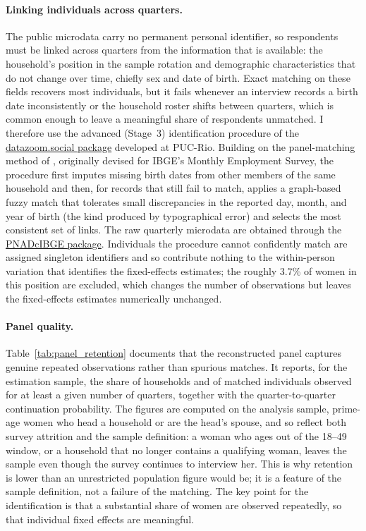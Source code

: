 \paragraph{Linking individuals across quarters.} The public microdata carry no permanent personal identifier, so respondents must be linked across quarters from the information that is available: the household's position in the sample rotation and demographic characteristics that do not change over time, chiefly sex and date of birth. Exact matching on these fields recovers most individuals, but it fails whenever an interview records a birth date inconsistently or the household roster shifts between quarters, which is common enough to leave a meaningful share of respondents unmatched. I therefore use the advanced (Stage~3) identification procedure of the \href{https://github.com/datazoompuc/datazoom.social}{datazoom.social package} \citep{DataZoom2024} developed at PUC-Rio. Building on the panel-matching method of \citet{ribassoares2008}, originally devised for IBGE's Monthly Employment Survey, the procedure first imputes missing birth dates from other members of the same household and then, for records that still fail to match, applies a graph-based fuzzy match that tolerates small discrepancies in the reported day, month, and year of birth (the kind produced by typographical error) and selects the most consistent set of links. The raw quarterly microdata are obtained through the \href{https://cran.r-project.org/package=PNADcIBGE}{PNADcIBGE package}. Individuals the procedure cannot confidently match are assigned singleton identifiers and so contribute nothing to the within-person variation that identifies the fixed-effects estimates; the roughly 3.7\% of women in this position are excluded, which changes the number of observations but leaves the fixed-effects estimates numerically unchanged.

\paragraph{Panel quality.} Table~\ref{tab:panel_retention} documents that the reconstructed panel captures genuine repeated observations rather than spurious matches. It reports, for the estimation sample, the share of households and of matched individuals observed for at least a given number of quarters, together with the quarter-to-quarter continuation probability. The figures are computed on the analysis sample, prime-age women who head a household or are the head's spouse, and so reflect both survey attrition and the sample definition: a woman who ages out of the 18--49 window, or a household that no longer contains a qualifying woman, leaves the sample even though the survey continues to interview her. This is why retention is lower than an unrestricted population figure would be; it is a feature of the sample definition, not a failure of the matching. The key point for the identification is that a substantial share of women are observed repeatedly, so that individual fixed effects are meaningful.

